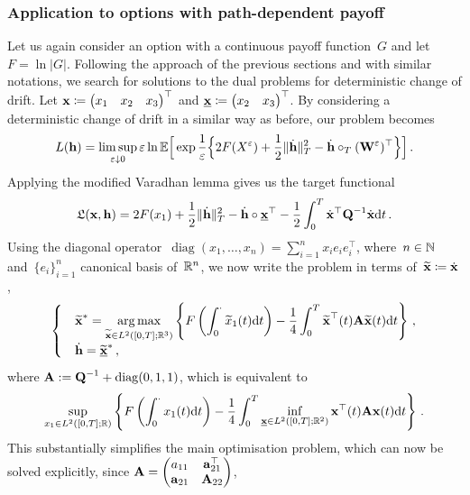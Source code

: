 \subsubsection{\textbf{Application to options with path-dependent payoff}}
Let us again consider an option with a continuous payoff function~$G$ and let~${F=\ln|G|}$. Following the approach of the previous sections and with similar notations, we search for solutions to the dual problems for deterministic change of drift.
Let 
$\boldsymbol{\mathrm{x}} \coloneqq \begin{pmatrix}x_1& x_2& x_3\end{pmatrix}^\top$ and 
$\underline{\boldsymbol{\mathrm{x}}}\coloneqq \begin{pmatrix}x_2 &  x_3\end{pmatrix}^\top$. 
By considering a deterministic change of drift in a similar way as before, our problem becomes 
\[
L(\boldsymbol{\mathrm{h}}) = \limsup\limits_{\varepsilon \downarrow 0} \varepsilon\ln\mathbb{E}\Big[\exp\frac{1}{\varepsilon}\Big\{
2F(X^\varepsilon) +\frac{1}{2}\|\dot{\boldsymbol{\mathrm{h}}}\|^2_T - \dot{\boldsymbol{\mathrm{h}}}\circ_{T}({\boldsymbol{\mathrm{W}}^\varepsilon})^\top\Big\}\Big]\,.
\]
Applying the modified Varadhan lemma gives us the 
target functional
$$
\mathfrak{L}(\boldsymbol{\mathrm{x}},\boldsymbol{\mathrm{h}}) = 2F(x_1) + \frac{1}{2}\|\dot{\boldsymbol{\mathrm{h}}}\|^2_T - \dot{\boldsymbol{\mathrm{h}}}\circ\underline{\boldsymbol{\mathrm{x}}}^\top - \frac{1}{2}\int_0^T\dot{\boldsymbol{\mathrm{x}}}^\top \boldsymbol{\mathrm{Q}}^{-1} \dot{\boldsymbol{\mathrm{x}}} \mathrm{d} t\,.
$$
Using the diagonal operator~$\operatorname{diag}(x_1,\dots,x_n)=\sum_{i=1}^n x_i e_i e_i^\top$, where~$n\in\mathbb{N}$ and~$\{e_i\}_{i=1}^n$ canonical basis of~$\mathbb{R}^n$, we now write the problem in terms of~$\widetilde{\boldsymbol{\mathrm{x}}}\coloneqq\dot{\boldsymbol{\mathrm{x}}}\,$,
$$
\begin{cases}
& \displaystyle \widetilde{\boldsymbol{\mathrm{x}}}^{*}  =  \operatorname*{arg\,max}\limits_{\widetilde{\boldsymbol{\mathrm{x}}} \in L^2([0,T]; \mathbb{R}^3)}
\left\{F\left(\int_0^\cdot \widetilde x_1(t) \mathrm{d} t\right) - \frac{1}{4}\int_0^T \widetilde{\boldsymbol{\mathrm{x}}}^\top(t) 
\boldsymbol{\mathrm{A}}\widetilde{\boldsymbol{\mathrm{x}}}(t) \mathrm{d} t\right\}\,, \\
& \displaystyle \dot{\boldsymbol{\mathrm{h}}} = \widetilde{\underline{\boldsymbol{\mathrm{x}}}}^{*}\,,
\end{cases}
$$
where 
$\boldsymbol{\mathrm{A}} := \boldsymbol{\mathrm{Q}}^{-1} + \operatorname{diag}(0,1,1)$, 
which is equivalent to
\begin{equation}\label{eq:SupInfInt}
\sup\limits_{x_1\in L^2([0,T]; \mathbb{R})}\left \{F\left(\int_0^\cdot x_1(t) \mathrm{d} t\right) - \frac{1}{4}\int_0^T \inf_{\underline{\boldsymbol{\mathrm{x}}}\in L^2([0,T]; \mathbb{R}^2)} \boldsymbol{\mathrm{x}}^\top(t) \boldsymbol{\mathrm{A}}\boldsymbol{\mathrm{x}}(t) \mathrm{d} t \right \}\,.
\end{equation}
This substantially simplifies the main optimisation problem, which can now be solved explicitly, since 
$
\boldsymbol{\mathrm{A}} =
\begin{pmatrix}
a_{11} & \boldsymbol{\mathrm{a}}_{21}^\top\\
\boldsymbol{\mathrm{a}}_{21} &\boldsymbol{\mathrm{A}}_{22}\\
\end{pmatrix}$,
